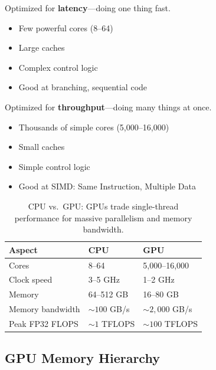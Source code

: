  Optimized for \textbf{latency}---doing one thing fast.
\begin{itemize}
    \item Few powerful cores (8--64)
    \item Large caches
    \item Complex control logic
    \item Good at branching, sequential code
\end{itemize}

 Optimized for \textbf{throughput}---doing many things at once.
\begin{itemize}
    \item Thousands of simple cores (5,000--16,000)
    \item Small caches
    \item Simple control logic
    \item Good at SIMD: Same Instruction, Multiple Data
\end{itemize}


\begin{table}[ht]
\centering
\begin{tabular}{p{}p{}p{}}
\toprule
\textbf{Aspect} & \textbf{CPU} & \textbf{GPU} \\
\midrule
Cores & 8--64 & 5,000--16,000 \\
Clock speed & 3--5 GHz & 1--2 GHz \\
Memory & 64--512 GB & 16--80 GB \\
Memory bandwidth & $\sim 100$ GB/s & $\sim 2,000$ GB/s \\
Peak FP32 FLOPS & $\sim 1$ TFLOPS & $\sim 100$ TFLOPS \\
\bottomrule
\end{tabular}
\vspace{2em}
\caption{CPU vs.\ GPU: GPUs trade single-thread performance for massive parallelism and memory bandwidth.}
\label{tab:cpu_vs_gpu}
\end{table}


\subsection{GPU Memory Hierarchy}


